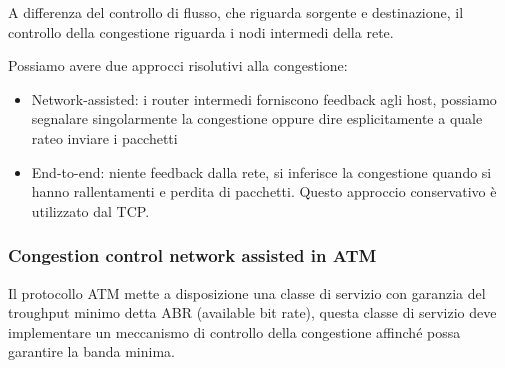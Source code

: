 A differenza del controllo di flusso, che riguarda sorgente e destinazione, il controllo della congestione riguarda i nodi intermedi della rete.

Possiamo avere due approcci risolutivi alla congestione:
\begin{itemize}
    \item Network-assisted: i router intermedi forniscono feedback agli host, possiamo segnalare singolarmente la congestione oppure dire esplicitamente a quale rateo inviare i pacchetti
    
    \item End-to-end: niente feedback dalla rete, si inferisce la congestione quando si hanno rallentamenti e perdita di pacchetti.
    Questo approccio conservativo è utilizzato dal TCP.
\end{itemize}


\subsubsection{Congestion control network assisted in ATM}
Il protocollo ATM mette a disposizione una classe di servizio con garanzia del troughput minimo detta ABR (available bit rate), questa classe di servizio deve implementare un meccanismo di controllo della congestione affinché possa garantire la banda minima.

